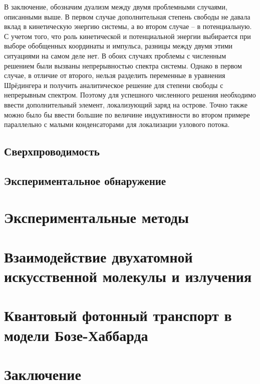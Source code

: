 \documentclass[14pt, a4paper]{extreport}
\renewcommand*\thesection{\arabic{section}}
\numberwithin{equation}{section}
\renewcommand*\thesection{\arabic{chapter}.\arabic{section}}
\begin{document}
В заключение, обозначим дуализм между двумя проблемными случаями, описанными выше. В первом случае дополнительная степень свободы не давала вклад в кинетическую энергию системы, а во втором случае -- в потенциальную. С учетом того, что роль кинетической и потенциальной энергии выбирается при выборе обобщенных координаты и импульса, разницы между двумя этими ситуациями на самом деле нет. В обоих случаях проблемы с численным решением были вызваны непрерывностью спектра системы. Однако в первом случае, в отличие от второго, нельзя разделить переменные в уравнения Шрёдингера и получить аналитическое решение для степени свободы с непрерывным спектром. Поэтому для успешного численного решения необходимо ввести дополнительный элемент, локализующий заряд на острове. Точно также можно было бы ввести большие по величине индуктивности во втором примере параллельно с малыми конденсаторами для локализации узлового потока.


\section{Сверхпроводимость}

\section{Экспериментальное обнаружение}



\chapter{Экспериментальные методы}

\chapter{Взаимодействие двухатомной искусственной молекулы и излучения}

\chapter{Квантовый фотонный транспорт в модели Бозе-Хаббарда}

\chapter{Заключение}


\appendix
\renewcommand*\thesection{\Alph{chapter}.\arabic{section}}


\renewcommand\bibname{Список литературы}


\end{document}

